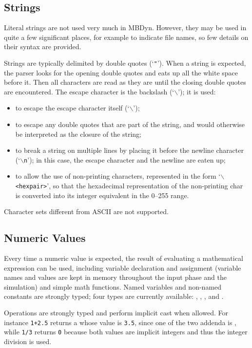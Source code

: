 \subsection{Strings}
Literal strings are not used very much in MBDyn.
However, they may be used in quite a few significant places,
for example to indicate file names, so few details on their syntax
are provided.

Strings are typically delimited by double quotes (`\texttt{"}').
When a string is expected, the parser looks for the opening 
double quotes and eats up all the white space before it.
Then all characters are read as they are until the closing 
double quotes are encountered.
The escape character is the backslash (`$\backslash$'); it is used:
\begin{itemize}
	\item to escape the escape character itself (`$\backslash$');
	\item to escape any double quotes that are part of the string,
		and would otherwise be interpreted as the closure
		of the string;
	\item to break a string on multiple lines by placing it
		before the newline character (`\texttt{$\backslash$n}');
		in this case, the escape character and the newline
		are eaten up;
	\item to allow the use of non-printing characters,
		represented in the form `\texttt{$\backslash$<hexpair>}',
		so that the hexadecimal representation of the
		non-printing char is converted into its integer
		equivalent in the 0--255 range.
\end{itemize}
Character sets different from ASCII are not supported.



\subsection{Numeric Values}
Every time a numeric value is expected, the result of evaluating 
a mathematical expression can be used, including variable declaration 
and assignment (variable names and values are kept in memory throughout
the input phase and the simulation) and simple math functions.
Named variables and non-named constants are strongly typed; four types are
currently available: , , , and .

Operations are strongly typed and perform implicit cast when allowed.
For instance \texttt{1+2.5} returns a  whose value 
is \texttt{3.5}, since one of the 
two addenda is , while \texttt{1/3} returns \texttt{0} because 
both values are implicit integers and thus the integer division is used.

